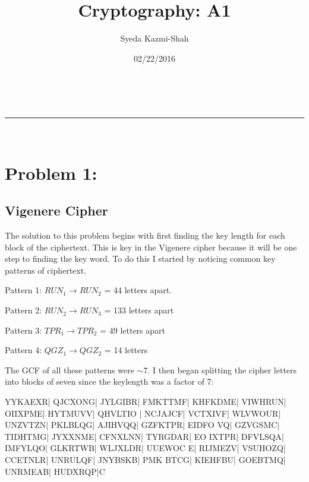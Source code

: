 \documentclass[a4paper,11pt]{article}
\makeatletter
\newcommand{\linia}{\rule{\linewidth}{0.5pt}}
\theoremstyle{mytheor}
\renewcommand{\maketitle}{
\begin{center}
\vspace{2ex}
{\huge \textsc{\@title}}
\vspace{1ex}
\\
\linia\\
\@author \hfill \@date
\vspace{4ex}
\end{center}
}
\makeatother
\begin{document}
\title{Cryptography: A1}

\author{Syeda Kazmi-Shah}

\date{02/22/2016}

\maketitle

\section*{Problem 1:}
\subsection*{Vigenere Cipher}

The solution to this problem begins with first finding the key length for each block of the ciphertext. This is key in the Vigenere cipher because it will be one step to finding the key word.  To do this I started by noticing common key patterns of ciphertext.
\bigskip

Pattern 1:  $RUN_{1} \rightarrow RUN_{2}$ = 44 letters apart.

Pattern 2: $RUN_{2} \rightarrow RUN_{3}$ = 133 letters apart

Pattern 3: $TPR_{1} \rightarrow TPR_{2}$ = 49 letters apart

Pattern 4: $QGZ_{1} \rightarrow QGZ_{2}$ = 14 letters
\bigskip

\noindent The GCF of all these patterns were $\sim{7}$.
I then began splitting the cipher letters into blocks of seven since the keylength was a factor of 7:
\bigskip 

\noindent YYKAEXR| QJCXONG| JYLGIBR| FMKTTMF| KHFKDME| VIWHRUN| OIIXPME| HYTMUVV| QHVLTIO
| NCJAJCF| VCTXIVF| WLVWOUR| UNZVTZN| PKLBLQG| AJIHVQQ| GZFKTPR| EIDFO VQ| GZVGSMC| TIDHTMG| JYXXNME| CFNXLNN| TYRGDAR| EO IXTPR| DFVLSQA| IMFYLQO| GLKRTWB| WLJXLDR| UUEWOC E| RIJMEZV| VSUHOZQ| CCETNLR| UNRULQF| JNYBSKB| PMK BTCG| KIEHFBU| GOEBTMQ| UNRMEAB| HUDXRQP|C
\end{document}
